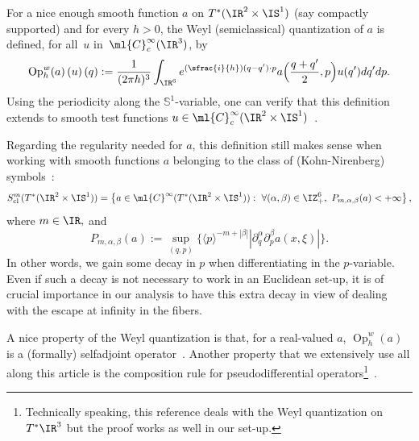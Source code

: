 \documentclass[JEP,XML,SOM,Unicode, NoEqCountersInSection,published]{cedram}
\newcommand{\Psfrac}[2]{(\sfrac{#1}{#2})}
\theoremstyle{plain}
\theoremstyle{definition}
\theoremstyle{remark}
\newcommand{\Op}{\operatorname{Op}}
\begin{document}
For a nice enough smooth function $a$ on $T^*(\IR^2\times\IS^1)$ (say compactly supported) and for every $h>0$, the Weyl (semiclassical) quantization of $a$ is defined, for all~$u$ in~$\ml{C}^\infty_c(\IR^3)$, by
\begin{equation}%
\text{Op}_h^w(a)\left(u\right)(q):=\frac{1}{(2\pi h)^3}\int_{\IR^6}e^{\Psfrac{i}{h}(q-q')\cdot p}a\Bigl(\frac{q+q'}{2},p\Bigr)u(q')dq'dp.
\end{equation}
Using the periodicity along the $\mathbb{S}^1$-variable, one can verify that this definition extends to smooth test functions $u\in\ml{C}^\infty_c(\IR^2\times\IS^1)$~\cite[\S5.3.1]{Zworski12}.

Regarding the regularity needed for $a$, this definition still makes sense when working with smooth functions $a$ belonging to the class of (Kohn-Nirenberg) symbols~\cite[\S 9.3]{Zworski12}:
\[
S^m_{\textup{cl}}(T^*(\IR^2\times\IS^1))=\left\{a\in\ml{C}^\infty(T^*(\IR^2\times\IS^1)):\ \forall(\alpha,\beta)\in\IZ_+^{6},\ P_{m,\alpha,\beta}(a)<+\infty\right\},
\]
where $m\in\IR,$ and
\[
P_{m,\alpha,\beta}(a):=\sup_{(q,p)}\{\langle p\rangle^{-m+|\beta|}|\partial_q^\alpha\partial_p^\beta a(x,\xi)|\}.
\]
In other words, we gain some decay in $p$ when differentiating in the $p$-variable. Even if such a decay is not necessary to work in an Euclidean set-up, it is of crucial importance in our analysis to have this extra decay in view of dealing with the escape at infinity in the fibers.

A nice property of the Weyl quantization is that, for a real-valued $a$, $\Op_h^w(a)$ is a (formally) selfadjoint operator~\cite[Th.\,4.1]{Zworski12}. Another property that we extensively use all along this article is the composition rule for pseudodifferential operators\footnote{Technically speaking, this reference deals with the Weyl quantization on $T^*\IR^3$ but the proof works as well in our set-up.}~\cite[Th.\,9.5, Th.\,4.12]{Zworski12}.
\end{document}
